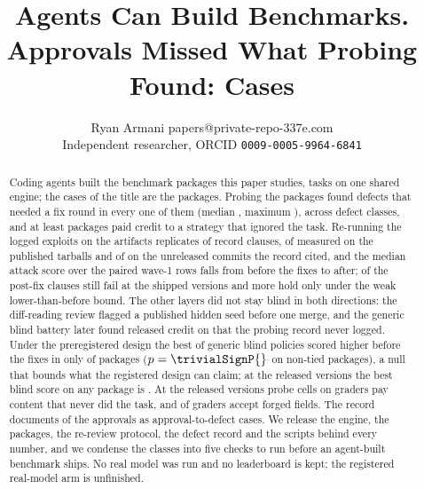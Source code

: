 \documentclass[twoside,11pt]{article}
\begin{document}
\title{Agents Can Build Benchmarks. Approvals Missed What Probing Found: \suitePackages{} Cases}
\author{\name Ryan Armani \email papers@private-repo-337e.com \\
       \addr Independent researcher, ORCID \texttt{0009-0005-9964-6841}}

\maketitle

\begin{abstract}
Coding agents built the \suitePackages{} benchmark packages this paper studies, \suiteTasks{} tasks on one shared engine; the \suitePackages{} cases of the title are the packages. Probing the packages found defects that needed a fix round in every one of them (median \reviewRoundsMedian{}, maximum \reviewRoundsMax{}), across  defect classes, and at least  packages paid credit to a strategy that ignored the task. Re-running the logged exploits on the artifacts replicates \expExplReplicated{} of \expExplRecordClauses{} record clauses, \expExplReplReleased{} of \expExplRecordReleased{} measured on the published tarballs and \expExplReplCommit{} of \expExplRecordCommit{} on the unreleased commits the record cited, and the median attack score over the \expExplAtkPairs{} paired wave-1 rows falls from \expExplAtkMedianOldPaired{} before the fixes to \expExplAtkMedianNewPaired{} after; \expExplFixFails{} of the \expExplPostfixClauses{} post-fix clauses still fail at the shipped versions and \expExplFixHoldsWeak{} more hold only under the weak lower-than-before bound. The other layers did not stay blind in both directions: the diff-reading review flagged a published hidden seed before one merge, and the generic blind battery later found released credit on \expTrivialReleasedMaxPkgs{} that the probing record never logged. Under the preregistered design the best of \trivialPolicies{} generic blind policies scored higher before the fixes in only \trivialHigherOld{} of \trivialPackages{} packages ($p = \trivialSignP{}$ on \trivialSignN{} non-tied packages), a null that bounds what the registered design can claim; at the released versions the best blind score on any package is \expTrivialReleasedMax{}. At the released versions \expProbesCreditFailCells{} probe cells on \expProbesCreditFailPkgCount{} graders pay content that never did the task, and \expProbesForgedAccepted{} of \expPackages{} graders accept forged fields. The record documents \approvalDefectCases{} of the \councilMergedApproved{} approvals as approval-to-defect cases. We release the engine, the packages, the re-review protocol, the defect record and the scripts behind every number, and we condense the classes into five checks to run before an agent-built benchmark ships. No real model was run and no leaderboard is kept; the registered real-model arm is unfinished.
\end{abstract}
\end{document}
